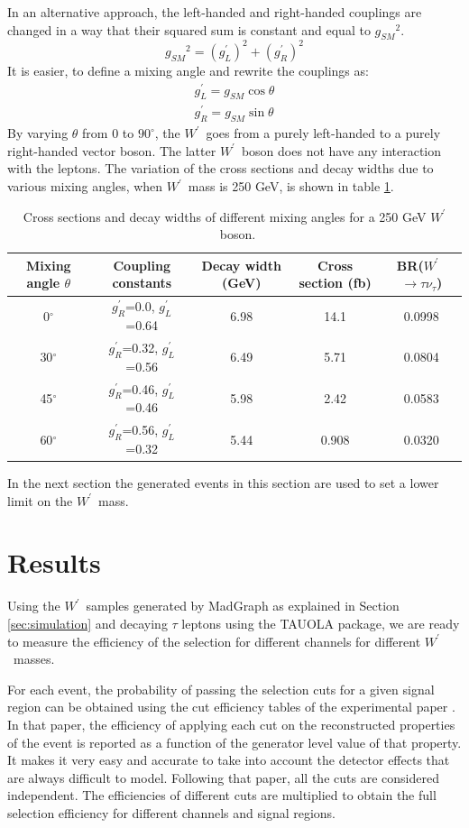 \documentclass[preprint,showpacs,preprintnumbers]{revtex4}
\newcommand{\wprime}{\ensuremath{W^\prime}~}
\newcommand{\gR}{\ensuremath{g^\prime_R}}
\newcommand{\gL}{\ensuremath{g^\prime_L}}
\newcommand{\gSM}{\ensuremath{g_{\scriptscriptstyle SM}}}
\begin{document}
In an alternative approach, the left-handed and right-handed couplings are changed in a way that their squared sum is constant and equal to $\gSM^2$.
\begin{equation}
\gSM^2 = (\gL)^2 +  (\gR)^2 
\end{equation}
It is easier, to define a mixing angle and rewrite the couplings as:
\begin{eqnarray}
\gL  = \gSM \cos\theta \\
\gR  = \gSM \sin\theta
\end{eqnarray}
By varying $\theta$ from 0 to $ 90^\circ $, the \wprime goes from a purely left-handed to a purely right-handed vector boson. The latter \wprime boson does not have any interaction with the leptons. 
The variation of the cross sections and decay widths due to various mixing angles, when \wprime mass is 250 GeV, is shown in table \ref{tab:mixingAngle}.
\begin{table}[htb]
	\centering
	\caption{Cross sections and decay widths of different mixing angles for a 250 GeV \wprime boson. \label{tab:mixingAngle} }
	\begin{tabular}{|c|c|c|c|c|}
		\hline 
		Mixing angle $\theta$  & Coupling constants & Decay width (GeV)  &  Cross section (fb) & BR(\wprime $\rightarrow \tau \nu_\tau$) \\
		\hline 
		0$^\circ$  & \gR=0.0, \gL=0.64  & 6.98  & 14.1 & 0.0998 \\
		30$^\circ$ & \gR=0.32, \gL=0.56 & 6.49  & 5.71 & 0.0804\\
		45$^\circ$ & \gR=0.46, \gL=0.46 & 5.98  & 2.42 & 0.0583\\
		60$^\circ$ & \gR=0.56, \gL=0.32 & 5.44  & 0.908 & 0.0320\\
		\hline
	\end{tabular}
\end{table}

In the next section the generated events in this section are used to set a lower limit on the \wprime mass.


\section{Results}\label{sec:results} 
Using the \wprime samples generated by MadGraph as explained in Section \ref{sec:simulation} and decaying $\tau$ leptons using the TAUOLA package, we are ready to measure the efficiency of the selection for different channels for different \wprime masses. 

For each event, the probability of passing the selection cuts for a given signal region can be obtained using the cut efficiency tables of the experimental paper \cite{Khachatryan:2016trj}. In that paper, the efficiency of applying each cut on the reconstructed properties of the event is reported as a function of the generator level value of that property. It makes it very easy and accurate to take into account the detector effects that are always difficult to model. Following that paper, all the cuts are considered independent.  The efficiencies of different cuts are multiplied to obtain the full selection efficiency for different channels and signal regions.
\end{document}
